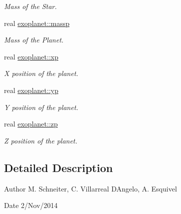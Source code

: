 \begin{DoxyCompactItemize}
\begin{DoxyCompactList}\small\item\em Mass of the Star. \end{DoxyCompactList}\item 
\hypertarget{namespaceexoplanet_a42dc35a9cdd9b1b8c10ddf245a1f2b8b}{}real \hyperlink{namespaceexoplanet_a42dc35a9cdd9b1b8c10ddf245a1f2b8b}{exoplanet\+::massp}\label{namespaceexoplanet_a42dc35a9cdd9b1b8c10ddf245a1f2b8b}

\begin{DoxyCompactList}\small\item\em Mass of the Planet. \end{DoxyCompactList}\item 
\hypertarget{namespaceexoplanet_a26bd2e233f9fb48ab288f5378aa12615}{}real \hyperlink{namespaceexoplanet_a26bd2e233f9fb48ab288f5378aa12615}{exoplanet\+::xp}\label{namespaceexoplanet_a26bd2e233f9fb48ab288f5378aa12615}

\begin{DoxyCompactList}\small\item\em X position of the planet. \end{DoxyCompactList}\item 
\hypertarget{namespaceexoplanet_a4beb49f2e3a5335b97cd702b68651fab}{}real \hyperlink{namespaceexoplanet_a4beb49f2e3a5335b97cd702b68651fab}{exoplanet\+::yp}\label{namespaceexoplanet_a4beb49f2e3a5335b97cd702b68651fab}

\begin{DoxyCompactList}\small\item\em Y position of the planet. \end{DoxyCompactList}\item 
\hypertarget{namespaceexoplanet_ad888a61279bbe33aed243934d0279253}{}real \hyperlink{namespaceexoplanet_ad888a61279bbe33aed243934d0279253}{exoplanet\+::zp}\label{namespaceexoplanet_ad888a61279bbe33aed243934d0279253}

\begin{DoxyCompactList}\small\item\em Z position of the planet. \end{DoxyCompactList}\end{DoxyCompactItemize}


\subsection{Detailed Description}
\begin{DoxyAuthor}{Author}
M. Schneiter, C. Villarreal D\textquotesingle{}Angelo, A. Esquivel 
\end{DoxyAuthor}
\begin{DoxyDate}{Date}
2/\+Nov/2014 
\end{DoxyDate}
